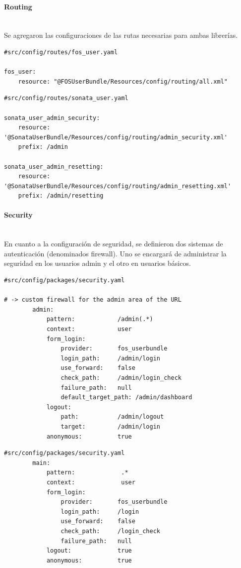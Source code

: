 \documentclass{article}
\newcommand{\myparagraph}[1]{\paragraph{#1}\mbox{}\\}
\begin{document}
\myparagraph{Routing}


Se agregaron las configuraciones de las rutas necesarias para ambas librerías.



\begin{lstlisting}[caption=archivo de configuración de rutas de FOSUser]
#src/config/routes/fos_user.yaml

fos_user:
    resource: "@FOSUserBundle/Resources/config/routing/all.xml"
\end{lstlisting}

\begin{lstlisting}[caption=archivo de configuración de rutas de sonata-user]
#src/config/routes/sonata_user.yaml

sonata_user_admin_security:
    resource: '@SonataUserBundle/Resources/config/routing/admin_security.xml'
    prefix: /admin

sonata_user_admin_resetting:
    resource: '@SonataUserBundle/Resources/config/routing/admin_resetting.xml'
    prefix: /admin/resetting

\end{lstlisting}

\myparagraph{Security}

En cuanto a la configuración de seguridad, se definieron dos sistemas de autenticación (denominados firewall)\@. Uno se encargará de administrar la seguridad en
los usuarios admin y el otro en usuarios básicos.

\begin{lstlisting}[caption=Firewall para el área admin del sistema.]
#src/config/packages/security.yaml

# -> custom firewall for the admin area of the URL
        admin:
            pattern:            /admin(.*)
            context:            user
            form_login:
                provider:       fos_userbundle
                login_path:     /admin/login
                use_forward:    false
                check_path:     /admin/login_check
                failure_path:   null
                default_target_path: /admin/dashboard
            logout:
                path:           /admin/logout
                target:         /admin/login
            anonymous:          true
\end{lstlisting}

\newpage
\begin{lstlisting}[caption=Firewall para el área de registro y login de usuarios básicos.]
#src/config/packages/security.yaml
        main:
            pattern:             .*
            context:             user
            form_login:
                provider:       fos_userbundle
                login_path:     /login
                use_forward:    false
                check_path:     /login_check
                failure_path:   null
            logout:             true
            anonymous:          true
\end{lstlisting}
\end{document}

